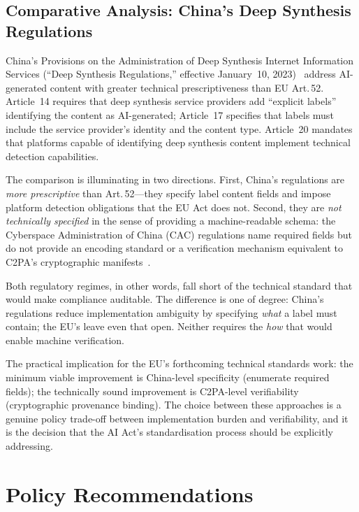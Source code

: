 \documentclass[conference]{IEEEtran}
\begin{document}
\subsection{Comparative Analysis: China's Deep Synthesis Regulations}

China's Provisions on the Administration of Deep Synthesis Internet
Information Services (``Deep Synthesis Regulations,'' effective
January~10, 2023)~\cite{china2023} address AI-generated content with
greater technical prescriptiveness than EU Art.\,52.  Article~14
requires that deep synthesis service providers add ``explicit labels''
identifying the content as AI-generated; Article~17 specifies that
labels must include the service provider's identity and the content
type.  Article~20 mandates that platforms capable of identifying deep
synthesis content implement technical detection capabilities.

The comparison is illuminating in two directions.  First, China's
regulations are \emph{more prescriptive} than Art.\,52---they specify
label content fields and impose platform detection obligations that the
EU Act does not.  Second, they are \emph{not technically specified} in
the sense of providing a machine-readable schema: the Cyberspace
Administration of China (CAC) regulations name required fields but do
not provide an encoding standard or a verification mechanism equivalent
to C2PA's cryptographic manifests~\cite{c2pa21}.

Both regulatory regimes, in other words, fall short of the technical
standard that would make compliance auditable.  The difference is one
of degree: China's regulations reduce implementation ambiguity by
specifying \emph{what} a label must contain; the EU's leave even that
open.  Neither requires the \emph{how} that would enable machine
verification.

The practical implication for the EU's forthcoming technical standards
work: the minimum viable improvement is China-level specificity
(enumerate required fields); the technically sound improvement is
C2PA-level verifiability (cryptographic provenance binding).  The
choice between these approaches is a genuine policy trade-off between
implementation burden and verifiability, and it is the decision that the
AI Act's standardisation process should be explicitly addressing.

\section{Policy Recommendations}
\label{sec:recommendations}
\end{document}
